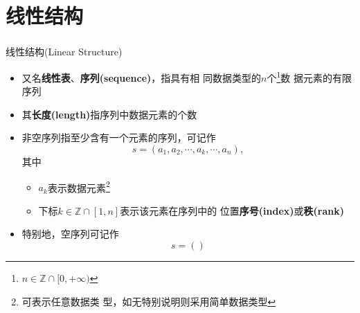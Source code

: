 \section{线性结构}

\begin{frame}
    \frametitle{\insertsectionhead}
    \begin{block}{线性结构(Linear Structure)}
        \begin{itemize}
            \item 又名\textbf{线性表}、\textbf{序列(sequence)}，指具有\alert{相
                  同}数据类型的$n$个\footnote{$n\in\mathbb{Z}\cap[0,+\infty)$}数
                  据元素的\alert{有限}序列
            \item 其\textbf{长度(length)}指序列中数据元素的个数
            \item 非空序列指至少含有一个元素的序列，可记作
                \[
                    s = (a_{1}, a_{2}, \cdots, a_{k}, \cdots, a_{n}),
                \]
                其中
                \begin{itemize}
                    \item $a_{k}$表示数据元素\footnote{可表示\alert{任意}数据类
                          型，如无特别说明则采用简单数据类型}
                    \item 下标$k \in \mathbb{Z} \cap [1, n]$表示该元素在序列中的
                          位置\textbf{序号(index)}或\textbf{秩(rank)}
                \end{itemize}
            \item 特别地，空序列可记作
                \[
                    s = ()
                \]
        \end{itemize}
    \end{block}
\end{frame}

